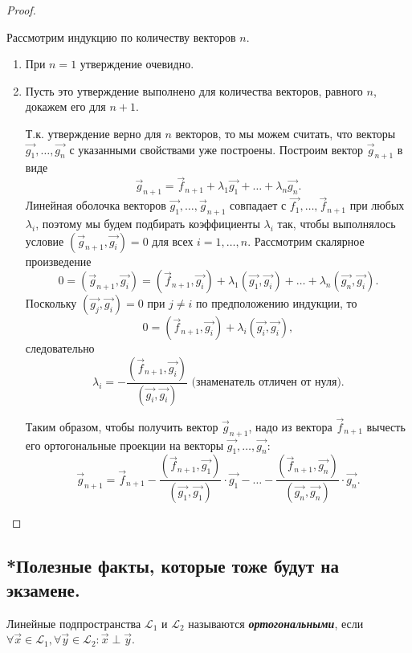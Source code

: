 \begin{proof}~

    Рассмотрим индукцию по количеству векторов $n$.
    \begin{enumerate}
        \item При $n = 1$ утверждение очевидно.
        \item Пусть это утверждение выполнено для количества векторов, равного $n$, докажем его для $n + 1$. 
        
        Т.к. утверждение верно для $n$ векторов, то мы можем считать, что векторы $\vec{g_1}, \ldots, \vec{g_n}$ с указанными свойствами уже построены. Построим вектор $\vec{g}_{n + 1}$ в виде 
        $$\vec{g}_{n + 1} = \vec{f}_{n + 1} + \lambda_1 \vec{g_1} + \ldots + \lambda_n\vec{g_n}.$$ 
        Линейная оболочка векторов $\vec{g_1}, \ldots,  \vec{g}_{n + 1}$ совпадает с $\vec{f_1}, \ldots, \vec{f}_{n + 1}$ при любых $\lambda_i$, поэтому мы будем подбирать коэффициенты $\lambda_i$ так, чтобы выполнялось условие $(\vec{g}_{n + 1},  \vec{g_i}) = 0$ для всех $i = 1, \ldots, n$. Рассмотрим скалярное произведение $$0 = (\vec{g}_{n + 1}, \vec{g_i}) = (\vec{f}_{n + 1}, \vec{g_i})+ \lambda_1(\vec{g_1}, \vec{g_i}) + \ldots + \lambda_n(\vec{g_n}, \vec{g_i}).$$
        Поскольку $(\vec{g_j}, \vec{g_i}) = 0$ при $j \ne i$ по предположению индукции, то 
        $$0 = (\vec{f}_{n + 1}, \vec{g_i}) + \lambda_i(\vec{g_i}, \vec{g_i}),$$ следовательно 
        $$\lambda_i = -\frac{(\vec{f}_{n + 1}, \vec{g_i})}{(\vec{g_i}, \vec{g_i})} \text{ (знаменатель отличен от нуля).}$$ 
        
        Таким образом, чтобы получить вектор $\vec{g}_{n + 1}$, надо из вектора $\vec{f}_{n + 1}$ вычесть его ортогональные проекции на векторы $\vec{g_1}, \ldots, \vec{g_n}$:
        $$\vec{g}_{n + 1} = \vec{f}_{n + 1} -\frac{(\vec{f}_{n + 1}, \vec{g_1})}{(\vec{g_1}, \vec{g_1})} \cdot \vec{g_1} - \ldots -\frac{(\vec{f}_{n + 1}, \vec{g_n})}{(\vec{g_n}, \vec{g_n})} \cdot \vec{g_n}.$$
    \end{enumerate}
\end{proof}


\newpage


\subsection{*Полезные факты, которые тоже будут на экзамене.}

\begin{definition}
    Линейные подпространства $\mathcal{L}_1$ и $\mathcal{L}_2$ называются \textbf{\textit{ортогональными}}, если $\forall \vec{x} \in \mathcal{L}_1, \forall \vec{y} \in \mathcal{L}_2 \colon \vec{x} \perp \vec{y}$.
\end{definition}

